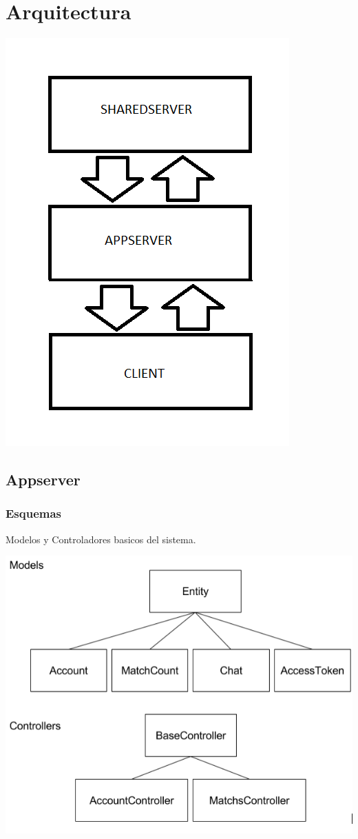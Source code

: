\documentclass[letterpaper,10pt,english]{sphinxmanual}
\begin{document}
\section{Arquitectura}
\label{manuals:arquitectura}
\includegraphics{architecture.png}


\subsection{Appserver}
\label{manuals:appserver}

\subsubsection{Esquemas}
\label{manuals:esquemas}
Modelos y Controladores basicos del sistema.

\includegraphics{classesapp.png}
\end{document}
